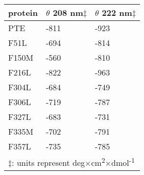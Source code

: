\begin{refsection}
\begin{table}[htbp]
\begin{tabular}{lll}
    protein & $\theta$ 208 nm$\ddag$ & $\theta$ 222 nm$\ddag$ \\
    \hline

    PTE & -811  & -923 \\
    F51L & -694 &  -814 \\
    F150M & -560 & -810 \\
    F216L & -822 & -963 \\
    F304L & -684 & -749 \\
    F306L & -719 & -787 \\
    F327L & -683 & -731 \\
    F335M & -702 & -791 \\
    F357L & -735 & -785 \\

    \hline
    \multicolumn{3}{l}{$\ddag$: units represent
        deg$\times$cm\textsuperscript{2}$\times$dmol\textsuperscript{-1}}
    \end{tabular} 
    \label{tab:cd-chap2-result}
\end{table}


\end{refsection}
